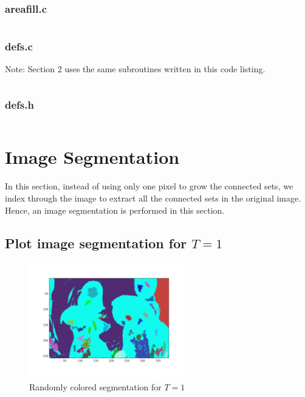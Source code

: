 \documentclass{article}
\begin{document}
	\subsubsection{areafill.c}
		\inputminted[tabsize=4,breaklines]{c}{areafill.c}
	\subsubsection{defs.c}
		Note: Section 2 uses the same subroutines written
		in this code listing.
		\inputminted[tabsize=4,breaklines]{c}{defs.c}
	\subsubsection{defs.h}
		\inputminted[tabsize=4,breaklines]{c}{defs.h}

\pagebreak

\section{Image Segmentation}
	In this section, instead of using only one pixel to grow the connected
	sets, we index through the image to extract all the connected sets in
	the original image. Hence, an image segmentation is performed in this
	section.

\subsection{Plot image segmentation for $T=1$}
	\begin{figure}[h]
		\begin{center}
			\includegraphics[width=0.6\textwidth]{img22gd2_sm1.png}
			\caption{Randomly colored segmentation for $T=1$}
		\end{center}
	\end{figure}
\end{document}
